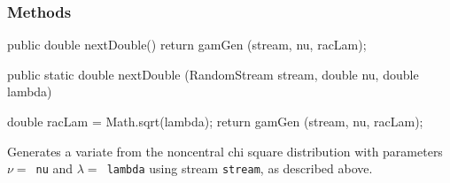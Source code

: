 \subsubsection* {Methods}
\begin{code}\begin{hide} 
  
   public double nextDouble() {
      return gamGen (stream, nu, racLam);
   }\end{hide}

   public static double nextDouble (RandomStream stream,
                                    double nu, double lambda) \begin{hide} {
      double racLam = Math.sqrt(lambda);
      return gamGen (stream, nu, racLam);
   }\end{hide}
\end{code}
 \begin{tabb}  Generates a variate from the noncentral chi square
   distribution with parameters $\nu = $~\texttt{nu} and $\lambda =
   $~\texttt{lambda} using stream \texttt{stream}, as described above.
 \end{tabb}
\begin{code}\begin{hide}

//>>>>>>>>>>>>>>>>>>>>  P R I V A T E    M E T H O D S   <<<<<<<<<<<<<<<<<<<< 

   private static double gamGen (RandomStream s, double nu, double racLam) {
      // racLam = sqrt(lambda)
      double x = NormalACRGen.nextDouble (s, racLam, 1.0);
      double y = GammaAcceptanceRejectionGen.nextDouble(s, 0.5*(nu - 1.0), 0.5);
      return x*x + y;
   }

}\end{hide}
\end{code}
